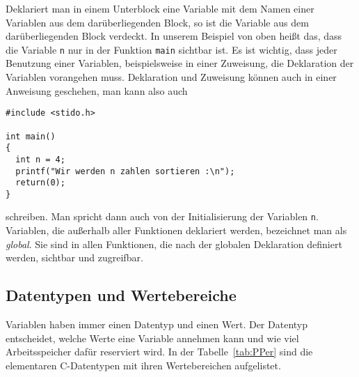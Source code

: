 Deklariert man in einem Unterblock eine Variable mit dem Namen einer Variablen aus dem darüberliegenden Block, so ist die Variable aus dem darüberliegenden Block verdeckt.
In unserem Beispiel von oben heißt das, dass die Variable \texttt{n} nur in der Funktion \texttt{main} sichtbar ist. 
Es ist wichtig, dass jeder Benutzung einer Variablen, beispielsweise in einer Zuweisung, die Deklaration der Variablen vorangehen muss.
Deklaration und Zuweisung können auch in einer Anweisung geschehen, man kann also auch
\begin{lstlisting}[caption={Erste Variablendeklaration und -zuweisung: Variante 2}, belowcaptionskip=0.3em]
#include <stido.h>

int main()
{
  int n = 4;
  printf("Wir werden n zahlen sortieren :\n");
  return(0);
}
\end{lstlisting}
schreiben. 
Man spricht dann auch von der Initialisierung der Variablen \texttt{n}.
Variablen, die außerhalb aller Funktionen deklariert werden, bezeichnet man als \emph{global}.
Sie sind in allen Funktionen, die nach der globalen Deklaration definiert werden, sichtbar und zugreifbar.


\subsection{Datentypen und Wertebereiche}

Variablen haben immer einen Datentyp und einen Wert. 
Der Datentyp entscheidet, welche Werte eine Variable annehmen kann und wie viel Arbeitsspeicher dafür reserviert wird.
In der Tabelle~\ref{tab:PPer} sind die elementaren C-Datentypen mit ihren Wertebereichen aufgelistet.

